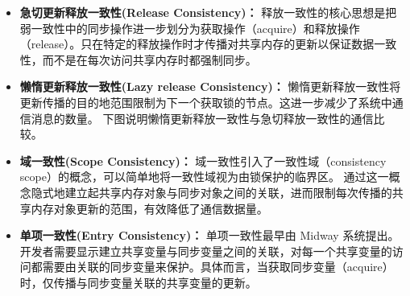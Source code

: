 {\begin{itemize}
\begin{figure}[!htbp]
                  \label{fig:oaspl}
              \end{figure}

        \item \textbf{急切更新释放一致性(Release Consistency)：} 释放一致性的核心思想是把弱一致性中的同步操作进一步划分为获取操作（acquire）和释放操作（release）。只在特定的释放操作时才传播对共享内存的更新以保证数据一致性，而不是在每次访问共享内存时都强制同步。

        \item \textbf{懒惰更新释放一致性(Lazy release Consistency)：} 懒惰更新释放一致性将更新传播的目的地范围限制为下一个获取锁的节点。这进一步减少了系统中通信消息的数量。
              下图说明懒惰更新释放一致性与急切释放一致性的通信比较。

        \item \textbf{域一致性(Scope Consistency)：} 域一致性引入了一致性域（consistency scope）的概念，可以简单地将一致性域视为由锁保护的临界区。
              通过这一概念隐式地建立起共享内存对象与同步对象之间的关联，进而限制每次传播的共享内存对象更新的范围，有效降低了通信数据量。

        \item \textbf{单项一致性(Entry Consistency)：} 单项一致性最早由 Midway 系统提出。开发者需要显示建立共享变量与同步变量之间的关联，对每一个共享变量的访问都需要由关联的同步变量来保护。具体而言，当获取同步变量（acquire）时，仅传播与同步变量关联的共享变量的更新。
    \end{itemize}

}
